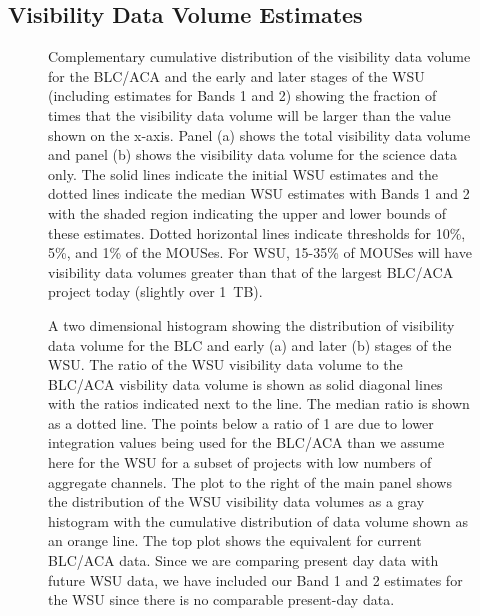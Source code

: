 \documentclass[preprint]{aastex631}
\begin{document}
\subsection{Visibility Data Volume Estimates} \label{sec:results_datavol}



\begin{figure}
  \caption{Complementary cumulative distribution of the visibility data volume for the BLC/ACA and the early and later stages of the WSU (including estimates for Bands 1 and 2) showing the fraction of times that the visibility data volume will be larger than the value shown on the x-axis. Panel (a) shows the total visibility data volume and panel (b) shows the visibility data volume for the science data only. The solid lines indicate the initial WSU estimates and the dotted lines indicate the median WSU estimates with Bands 1 and 2 with the shaded region indicating the upper and lower bounds of these estimates. Dotted horizontal lines indicate thresholds for 10\%, 5\%, and 1\% of the MOUSes. For WSU, 15-35\% of MOUSes will have visibility data volumes greater than that of  the largest BLC/ACA project today (slightly over 1~TB).  } \label{fig:datavol_cumulative_dist}
\end{figure}



\begin{figure}
    \caption{A two dimensional histogram showing the distribution of visibility data volume for the BLC and  early (a) and later (b) stages of the WSU. The ratio of the WSU visibility data volume to the BLC/ACA visbility data volume is shown as solid diagonal lines with the ratios  indicated next to the line. The median ratio is shown as a dotted line. The points below a ratio of 1 are due to lower integration values being used for the BLC/ACA than we assume here for the WSU for a subset of projects with low numbers of aggregate channels. The plot to the right of the main panel shows the distribution of the WSU visibility data volumes as a gray histogram with the cumulative distribution of data volume shown as an orange line. The top plot shows the equivalent for current BLC/ACA data. Since we are comparing present day data with future WSU data, we have included our Band 1 and 2 estimates for the WSU since there is no comparable present-day data.}
    \label{fig:datavol_comp}
\end{figure}
\end{document}
